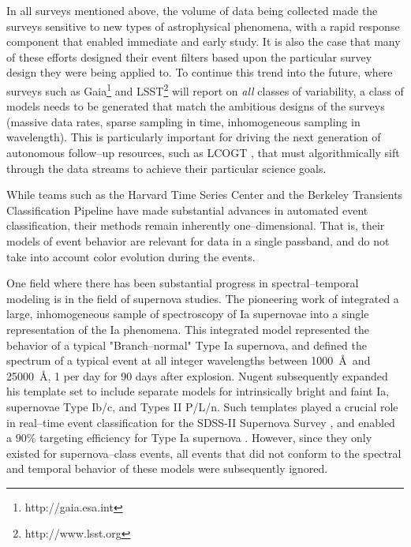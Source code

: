 In all surveys mentioned above, the volume of data being collected made the
surveys sensitive to new types of astrophysical phenomena, with a rapid response
component that enabled immediate and early study.  It is also the case that many
of these efforts designed their event filters based upon the particular survey
design they were being applied to.  To continue this trend into the future,
where surveys such as Gaia\footnote{http://gaia.esa.int} and
LSST\footnote{http://www.lsst.org} will report on {\it all} classes of
variability, a class of models needs to be generated that match the ambitious
designs of the surveys (massive data rates, sparse sampling in time,
inhomogeneous sampling in wavelength).  This is particularly important for
driving the next generation of autonomous follow--up resources, such as LCOGT
\citep{2008AN....329..269H}, that must algorithmically sift through the data
streams to achieve their particular science goals.

 \smallskip

While teams such as the Harvard Time Series Center \citep{} and the Berkeley
Transients Classification Pipeline \citep{} have made substantial advances in
automated event classification, their methods remain inherently
one--dimensional. That is, their models of event behavior are relevant for data
in a single passband, and do not take into account color evolution during the
events.

One field where there has been substantial progress in spectral--temporal
modeling is in the field of supernova studies. The pioneering work of
\cite{2002PASP..114..803N} integrated a large, inhomogeneous sample of
spectroscopy of Ia supernovae into a single representation of the Ia phenomena.
This integrated model represented the behavior of a typical "Branch--normal"
Type Ia supernova, and defined the spectrum of a typical event at all integer
wavelengths between 1000~\AA~and 25000~\AA, 1 per day for 90 days after
explosion.  Nugent subsequently expanded his template set to include separate
models for intrinsically bright and faint Ia, supernovae Type Ib/c, and Types II
P/L/n. Such templates played a crucial role in real--time event classification
for the SDSS-II Supernova Survey \citep{2008AJ....135..338F}, and enabled a
$90\%$ targeting efficiency for Type Ia supernova \citep{2008AJ....135..348S}.
However, since they only existed for supernova--class events, all events that
did not conform to the spectral and temporal behavior of these models were
subsequently ignored.

